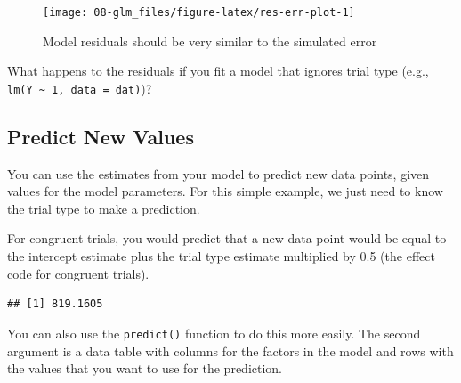 \documentclass[
  oneside]{book}
\newenvironment{Shaded}{\begin{snugshade}}{\end{snugshade}}
\newcommand{\NormalTok}[1]{#1}
\newcommand{\OtherTok}[1]{\textcolor[rgb]{0.56,0.35,0.01}{#1}}
\newcommand{\SpecialCharTok}[1]{\textcolor[rgb]{0.00,0.00,0.00}{#1}}
\newcommand{\StringTok}[1]{\textcolor[rgb]{0.31,0.60,0.02}{#1}}
\begin{document}
\begin{figure}

{\centering \texttt{[image: 08-glm\_files/figure-latex/res-err-plot-1]} 

}

\caption{Model residuals should be very similar to the simulated error}\label{fig:res-err-plot}
\end{figure}

\begin{try}
What happens to the residuals if you fit a model that ignores trial type (e.g., \texttt{lm(Y\ \textasciitilde{}\ 1,\ data\ =\ dat)})?

\end{try}

\hypertarget{predict}{%
\subsection{Predict New Values}\label{predict}}

You can use the estimates from your model to predict new data points, given values for the model parameters. For this simple example, we just need to know the trial type to make a prediction.

For congruent trials, you would predict that a new data point would be equal to the intercept estimate plus the trial type estimate multiplied by 0.5 (the effect code for congruent trials).

\begin{Shaded}
\end{Shaded}

\begin{verbatim}
## [1] 819.1605
\end{verbatim}

You can also use the \texttt{predict()} function to do this more easily. The second argument is a data table with columns for the factors in the model and rows with the values that you want to use for the prediction.
\end{document}
